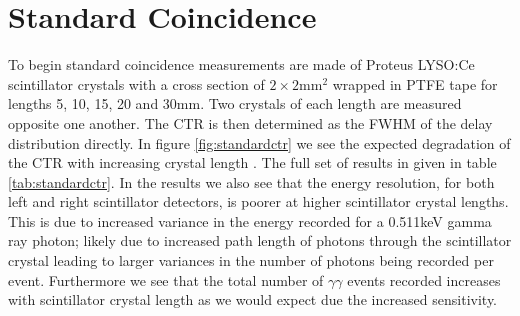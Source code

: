 \section{Standard Coincidence}
\label{sec:standardctr}
To begin standard coincidence measurements are made of Proteus LYSO:Ce scintillator crystals with a cross section of $2\times2$mm$^2$ wrapped in PTFE tape for lengths 5, 10, 15, 20 and 30mm. Two crystals of each length are measured opposite one another. The CTR is then determined as the FWHM of the delay distribution directly. In figure \ref{fig:standardctr} we see the expected degradation of the CTR with increasing crystal length \cite{r_Paganoni_Pauwels_et_al__2011}\cite{Wiener_Kaul_Surti_Karp_2010}\cite{Choong_2009}\cite{Gola_Piemonte_Tarolli_2013}\cite{o_Pro_Serra_Tarolli_Zorzi_2011}. The full set of results in given in table \ref{tab:standardctr}. In the results we also see that the energy resolution, for both left and right scintillator detectors, is poorer at higher scintillator crystal lengths. This is due to increased variance in the energy recorded for a 0.511keV gamma ray photon; likely due to increased path length of photons through the scintillator crystal leading to larger variances in the number of photons being recorded per event. Furthermore we see that the total number of $\gamma\gamma$ events recorded increases with scintillator crystal length as we would expect due the increased sensitivity.